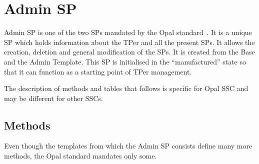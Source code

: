 

\section{Admin SP}
\label{admin_sp}


Admin SP is one of the two SPs mandated by the Opal standard~\cite{tcg-opal2}. It is a unique SP which holds information about the TPer and all the present SPs. It allows the creation, deletion and general modification of the SPs.
It is created from the Base and the Admin Template.
This SP is initialised in the ``manufactured'' state so that it can function as a starting point of TPer management. 

The description of methods and tables that follows is specific for Opal SSC and may be different for other SSCs. 





\subsection{Methods}

Even though the templates from which the Admin SP consists define many more methods, the Opal standard mandates only some.


